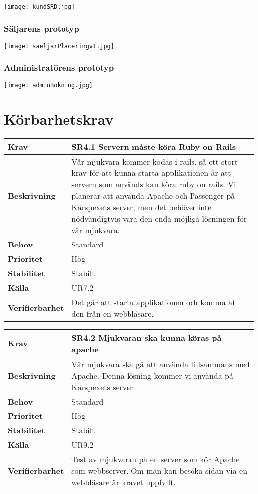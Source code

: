 \documentclass[a4paper, twoside, 11pt, titlepage]{article}
\begin{document}
		\texttt{[image: kundSRD.jpg]}

		\subsubsection{Säljarens prototyp}


		\texttt{[image: saeljarPlaceringv1.jpg]}

		\subsubsection{Administratörens prototyp}


		\texttt{[image: adminBokning.jpg]}

\clearpage
\section{Körbarhetskrav}


\begin{tabular} { p{2.6cm} p{12.5cm} }
	\hline
	\sffamily\textbf{Krav} & \sffamily\textbf{SR4.1 Servern måste köra Ruby on Rails } \\
	\hline
	\sffamily\textbf{Beskrivning} & Vår mjukvara kommer kodas i rails, så ett stort krav för att kunna starta applikationen är att servern som används kan köra ruby on rails. Vi planerar att använda Apache och Passenger på Kårspexets server, men det behöver inte nödvändigtvis vara den enda möjliga lösningen för vår mjukvara.  \\
	\hline
	\sffamily\textbf{Behov} & Standard  \\
	\hline
	\sffamily\textbf{Prioritet} & Hög  \\
	\hline
	\sffamily\textbf{Stabilitet} & Stabilt  \\
	\hline
	\sffamily\textbf{Källa} & UR7.2  \\
	\hline
	\sffamily\textbf{Verifierbarhet} & Det går att starta applikationen och komma åt den från en webbläsare.  \\
	\hline
\end{tabular}
\vspace{6mm}

\begin{tabular} { p{2.6cm} p{12.5cm} }
	\hline
	\sffamily\textbf{Krav} & \sffamily\textbf{SR4.2 Mjukvaran ska kunna köras på apache } \\
	\hline
	\sffamily\textbf{Beskrivning} & Vår mjukvara ska gå att använda tillsammans med Apache. Denna lösning kommer vi använda på Kårspexets server.  \\
	\hline
	\sffamily\textbf{Behov} & Standard  \\
	\hline
	\sffamily\textbf{Prioritet} & Hög  \\
	\hline
	\sffamily\textbf{Stabilitet} & Stabilt  \\
	\hline
	\sffamily\textbf{Källa} & UR9.2  \\
	\hline
	\sffamily\textbf{Verifierbarhet} & Test av mjukvaran på en server som kör Apache som webbserver. Om man kan besöka sidan via en webbläsare är kravet uppfyllt.  \\
	\hline
\end{tabular}
\vspace{6mm}
\end{document}
